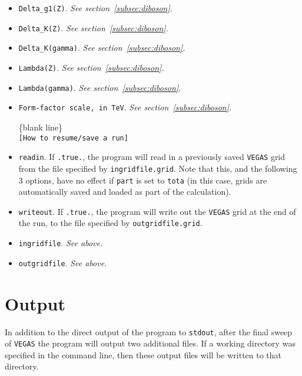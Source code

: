 \documentclass[12pt]{article}
\begin{document}
\begin{itemize}
\begin{center}
\{blank line\} \\
{\tt [Anomalous couplings of the W and Z] }
\end{center}

\item {\tt Delta\_g1(Z)}. {\it See section~\ref{subsec:diboson}.}
\item {\tt Delta\_K(Z)}. {\it See section~\ref{subsec:diboson}.}
\item {\tt Delta\_K(gamma)}. {\it See section~\ref{subsec:diboson}.}
\item {\tt Lambda(Z)}. {\it See section~\ref{subsec:diboson}.}
\item {\tt Lambda(gamma)}. {\it See section~\ref{subsec:diboson}.}
\item {\tt Form-factor scale, in TeV}. {\it See section~\ref{subsec:diboson}.}

\begin{center}
\{blank line\} \\
{\tt [How to resume/save a run] }
\end{center}

\item {\tt readin}. If {\tt .true.}, the program will read in a
previously saved {\tt VEGAS} grid from the file specified by
{\tt ingridfile.grid}. Note that this, and the following 3 options,
have no effect if {\tt part} is set to {\tt tota} (in this case, grids
are automatically saved and loaded as part of the calculation).

\item {\tt writeout}. If {\tt .true.}, the program will write out
the {\tt VEGAS} grid at the end of the run, to the file specified by
{\tt outgridfile.grid}.

\item {\tt ingridfile}.  {\it See above.}

\item {\tt outgridfile}.  {\it See above.}

\end{itemize}

\section{Output}
 
In addition to the direct output of the program to {\tt stdout}, after
the final sweep of {\tt VEGAS} the program will output two additional files.
If a working directory was specified in the command line, then these
output files will be written to that directory.
\end{document}
